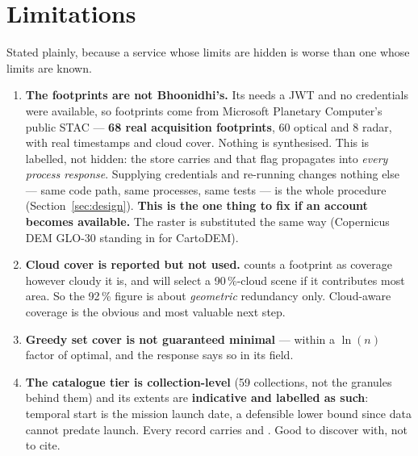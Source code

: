 \section{Limitations}
\label{sec:limitations}

Stated plainly, because a service whose limits are hidden is worse than one
whose limits are known.

\begin{enumerate}[leftmargin=1.8em,itemsep=0.7ex]

\item \textbf{The footprints are not Bhoonidhi's.} Its  needs a
JWT and no credentials were available, so footprints come from Microsoft
Planetary Computer's public STAC --- \textbf{68 real acquisition footprints},
60 optical and 8 radar, with real timestamps and cloud cover. Nothing is
synthesised. This is labelled, not hidden: the store carries
 and that flag propagates into
\emph{every process response}. Supplying credentials and re-running
 changes nothing else --- same
code path, same processes, same tests ---  is the whole procedure (Section~\ref{sec:design}).
\textbf{This is the one thing to fix if an account becomes available.} The raster is substituted the same way
(Copernicus DEM GLO-30 standing in for CartoDEM).

\item \textbf{Cloud cover is reported but not used.}  counts
a footprint as coverage however cloudy it is, and  will
select a 90\,\%-cloud scene if it contributes most area. So the 92\,\% figure
is about \emph{geometric} redundancy only. Cloud-aware coverage is the obvious
and most valuable next step.

\item \textbf{Greedy set cover is not guaranteed minimal} --- within a $\ln(n)$
factor of optimal, and the response says so in its  field.

\item \textbf{The catalogue tier is collection-level} (59 collections, not the
granules behind them) and its extents are \textbf{indicative and labelled as
such}: temporal start is the mission launch date, a defensible lower bound since
data cannot predate launch. Every record carries
 and . Good to
discover with, not to cite.


\end{enumerate}
